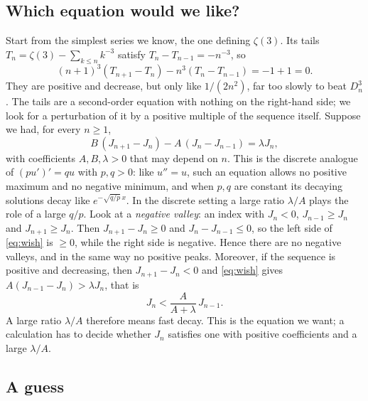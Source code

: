 \documentclass[11pt]{article}
\newcommand{\Dn}{D_n}
\theoremstyle{plain}
\theoremstyle{definition}
\theoremstyle{remark}
\begin{document}
\subsection{Which equation would we like?}\label{sec:wish}

Start from the simplest series we know, the one defining $\zeta(3)$. Its tails
$T_n=\zeta(3)-\sum_{k\le n}k^{-3}$ satisfy $T_n-T_{n-1}=-n^{-3}$, so
\[
  (n+1)^3(T_{n+1}-T_n)-n^3(T_n-T_{n-1})=-1+1=0 .
\]
They are positive and decrease, but only like $1/(2n^2)$, far too slowly to beat $\Dn^3$. The tails
are a second-order equation with nothing on the right-hand side; we look for a perturbation of it
by a positive multiple of the sequence itself. Suppose we had, for every $n\ge1$,
\begin{equation}\label{eq:wish}
  B\,(J_{n+1}-J_n)-A\,(J_n-J_{n-1})=\lambda J_n,
\end{equation}
with coefficients $A,B,\lambda>0$ that may depend on $n$. This is the discrete analogue of
$(pu')'=qu$ with $p,q>0$: like $u''=u$, such an equation allows no positive maximum and no negative
minimum, and when $p,q$ are constant its decaying solutions decay like $e^{-\sqrt{q/p}\,x}$.
In the discrete setting a large ratio $\lambda/A$ plays the role of a large $q/p$.
Look at a \emph{negative valley}: an index with $J_n<0$, $J_{n-1}\ge J_n$ and $J_{n+1}\ge J_n$. Then
$J_{n+1}-J_n\ge0$ and $J_n-J_{n-1}\le0$, so the left side of \eqref{eq:wish} is $\ge0$, while the
right side is negative. Hence there are no negative valleys, and in the same way no positive peaks.
Moreover, if the sequence is positive and decreasing, then $J_{n+1}-J_n<0$ and
\eqref{eq:wish} gives $A(J_{n-1}-J_n)>\lambda J_n$, that is
\[
  J_n<\frac{A}{A+\lambda}\,J_{n-1}.
\]
A large ratio $\lambda/A$ therefore means fast decay. This is the equation we want; a calculation has to
decide whether $J_n$ satisfies one with positive coefficients and a large $\lambda/A$.

\subsection{A guess}\label{sec:guess}
\end{document}
